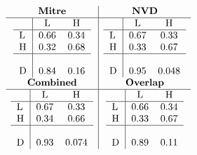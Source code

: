 \documentclass[11pt]{article}
\begin{document}
\begin{table}
	\centering
	\caption{Confusion matrices attackComplexity}
	\[
		\begin{array}{c|c}
			\textbf{Mitre}    & \textbf{NVD}     \\
			\hline
			\begin{tabular}{l|cc}
				  & L    & H    \\
				\hline
				L & 0.66 & 0.34 \\
				H & 0.32 & 0.68 \\
				\hline          \\
				D & 0.84 & 0.16 \\
			\end{tabular}
			                  &
			\begin{tabular}{l|cc}
				  & L    & H     \\
				\hline
				L & 0.67 & 0.33  \\
				H & 0.33 & 0.67  \\
				\hline           \\
				D & 0.95 & 0.048 \\
			\end{tabular}
			\\
			\textbf{Combined} & \textbf{Overlap} \\
			\hline
			\begin{tabular}{l|cc}
				  & L    & H     \\
				\hline
				L & 0.67 & 0.33  \\
				H & 0.34 & 0.66  \\
				\hline           \\
				D & 0.93 & 0.074 \\
			\end{tabular}
			                  &
			\begin{tabular}{l|cc}
				  & L    & H    \\
				\hline
				L & 0.66 & 0.34 \\
				H & 0.33 & 0.67 \\
				\hline          \\
				D & 0.89 & 0.11 \\
			\end{tabular}
		\end{array}
	\]
\end{table}
\end{document}

